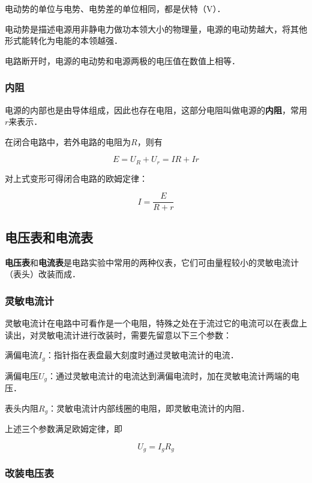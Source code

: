 电动势的单位与电势、电势差的单位相同，都是伏特（$\mathrm{V}$）．

电动势是描述电源用非静电力做功本领大小的物理量，电源的电动势越大，将其他形式能转化为电能的本领越强．

电路断开时，电源的电动势和电源两极的电压值在数值上相等．

\subsubsection{内阻}

电源的内部也是由导体组成，因此也存在电阻，这部分电阻叫做电源的\textbf{内阻}，常用$r$来表示．

在闭合电路中，若外电路的电阻为$R$，则有

\begin{equation}
E=U_R+U_r=IR+Ir
\end{equation}

对上式变形可得闭合电路的欧姆定律：

\begin{equation}
I=\frac{E}{R+r}
\end{equation}

\subsection{电压表和电流表}


\textbf{电压表}和\textbf{电流表}是电路实验中常用的两种仪表，它们可由量程较小的灵敏电流计（表头）改装而成．

\subsubsection{灵敏电流计}

灵敏电流计在电路中可看作是一个电阻，特殊之处在于流过它的电流可以在表盘上读出，对灵敏电流计进行改装时，需要先留意以下三个参数：

满偏电流$I_g$：指针指在表盘最大刻度时通过灵敏电流计的电流．

满偏电压$U_g$：通过灵敏电流计的电流达到满偏电流时，加在灵敏电流计两端的电压．

表头内阻$R_g$：灵敏电流计内部线圈的电阻，即灵敏电流计的内阻．

上述三个参数满足欧姆定律，即

\begin{equation}
U_g=I_g R_g
\end{equation}

\subsubsection{改装电压表}

